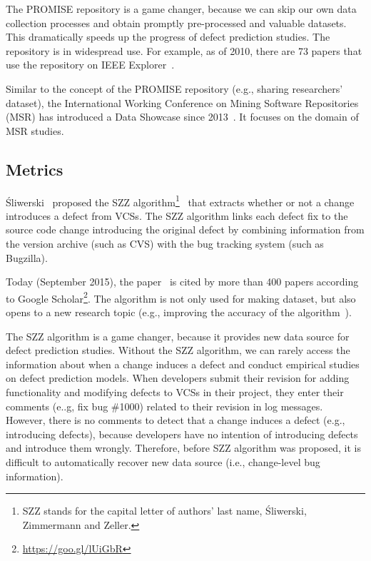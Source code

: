 The PROMISE repository is a game changer, because we can skip our own data collection processes and obtain promptly pre-processed and valuable datasets.
This dramatically speeds up the progress of defect prediction studies. 
The repository is in widespread use. For example, as of 2010, there are 73 papers that use the repository on IEEE Explorer~\cite{promiserepo}.

Similar to the concept of the PROMISE repository (e.g., sharing researchers' dataset), the International Working Conference on Mining Software Repositories (MSR) has introduced a Data Showcase since 2013~\cite{MSR2013DataShowcase}. It focuses on the domain of MSR studies.


\subsection{Metrics}

\'{S}liwerski \ea ~proposed the SZZ algorithm\footnote{SZZ stands for the capital letter of authors' last name, \'{S}liwerski, Zimmermann and Zeller.}~\cite{sliwerski2005} that extracts whether or not a change introduces a defect from VCSs. The SZZ algorithm links each defect fix to the source code change introducing the original defect by combining information from the version archive (such as CVS) with the bug tracking system (such as Bugzilla).

Today (September 2015), the paper~\cite{sliwerski2005} is cited by more than 400 papers according to Google Scholar\footnote{\url{https://goo.gl/lUiGbR}}. The algorithm is not only used for making dataset, but also opens to a new research topic (e.g., improving the accuracy of the algorithm~\cite{Kim2006ASE}).

The SZZ algorithm is a game changer, because it provides new data source for defect prediction studies. Without the SZZ algorithm, we can rarely access the information about when a change induces a defect and conduct empirical studies on defect prediction models.
When developers submit their revision for adding functionality and modifying defects to VCSs in their project, they enter their comments (e..g, fix bug \#1000) related to their revision in log messages.
However, there is no comments to detect that a change induces a defect (e.g., introducing defects), because developers 
have no intention of introducing defects and introduce them wrongly.
Therefore, before SZZ algorithm was proposed, it is difficult to automatically recover new data source (i.e., change-level bug information). 

